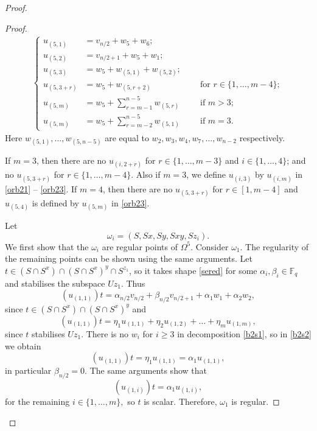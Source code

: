 \begin{proof}
\begin{proof}
\begin{gather}
\left\{ 
\begin{aligned}\label{orb23}
u_{(5,1)} & =v_{n/2}+w_5+w_6;\\
u_{(5,2)} & =v_{n/2+1}+w_5+w_1;\\
u_{(5,3)} & =w_5+w_{(5,1)}+w_{(5,2)};\\
u_{(5,3+r)} & =w_5+w_{(5,r+2)}\phantom{;} && \text{ for } r \in \{1, \ldots, m-4\};\\
u_{(5,m)} & =w_5 +\sum_{r=m-1}^{n-5}w_{(5,r)}\phantom{;} && \text{ if } m>3;\\
u_{(5,m)} & =w_5 +\sum_{r=m-2}^{n-5}w_{(5,1)}\phantom{;} && \text{ if } m=3.
\end{aligned}
\right. 
\end{gather}
Here $w_{(5,1)}, \ldots, w_{(5,n-5)}$ are equal to $w_2, w_3, w_4, w_7, \ldots, w_{n-2}$ respectively.

 If $m=3$, then there are no  
$u_{(i,2+r)}$ for   $r \in \{1, \ldots, m-3\}$ and $i \in \{1, \ldots, 4\}$; and no $u_{(5,3+r)}$ for   $r \in \{1, \ldots, m-4\}$. Also if $m=3$, we define $u_{(i,3)}$   by $u_{(i,m)}$ in \eqref{orb21} -- \eqref{orb23}.   If $m=4$, then there are no  
$u_{(5,3+r)}$ for   $r \in [1, m-4]$ and $u_{(5,4)}$ is defined by $u_{(5,m)}$ in \eqref{orb23}.

 Let $$\omega_i=(S,Sx,Sy,Sxy,Sz_i).$$ We first show  that the  $\omega_i$ are regular points of $\Omega^5$. Consider $\omega_1$. The regularity of the remaining points can be shown using the same arguments. Let $t \in (S \cap S^x) \cap (S \cap S^x)^y \cap S^{z_1}$, so it takes shape \eqref{sered} for some $\alpha_i, \beta_i \in \mathbb{F}_q$ and stabilises the subspace $Uz_1.$ Thus
\begin{equation}\label{b2s1}
(u_{(1,1)})t=\alpha_{n/2} v_{n/2} + \beta_{n/2} v_{n/2+1} +\alpha_1 w_1 + \alpha_2 w_2,
\end{equation}
since $t \in (S \cap S^x) \cap (S \cap S^x)^y$ and 
\begin{equation}\label{b2s2}
(u_{(1,1)})t=\eta_1 u_{(1,1)} +\eta_2 u_{(1,2)} + \ldots + \eta_m u_{(1,m)},
\end{equation}
since $t$ stabilises  $Uz_1.$ There is no $w_i$ for $i \ge 3$ in decomposition \eqref{b2s1}, so in \eqref{b2s2} we obtain
$$(u_{(1,1)})t=\eta_1 u_{(1,1)}=\alpha_1 u_{(1,1)},$$
in particular $\beta_{n/2}=0$. The same arguments show that 
$$(u_{(1,i)})t=\alpha_1 u_{(1,i)},$$
for the remaining $i \in \{1, \ldots , m\},$ so $t$ is scalar. Therefore, $\omega_1$ is regular.


\end{proof}
\end{proof}
